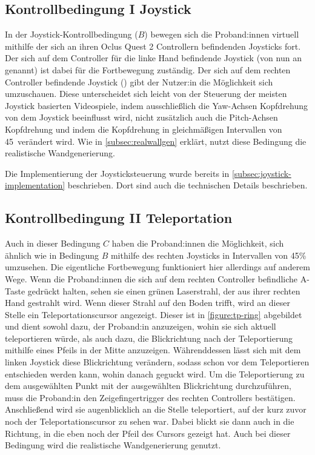         \subsection{Kontrollbedingung I Joystick}\label{subsec:joystick}
            In der Joystick-Kontrollbedingung ($B$) bewegen sich die Proband:innen virtuell mithilfe der sich an ihren Oclus Quest 2 Controllern befindenden Joysticks fort. %
            Der sich auf dem Controller für die linke Hand befindende Joystick (von nun an  genannt) ist dabei für die Fortbewegung zuständig. Der sich auf dem rechten Controller befindende Joystick () gibt der Nutzer:in die Möglichkeit sich umzuschauen. Diese unterscheidet sich leicht von der Steuerung der meisten Joystick basierten Videospiele, indem ausschließlich die Yaw-Achsen Kopfdrehung von dem Joystick beeinflusst wird, nicht zusätzlich auch die Pitch-Achsen Kopfdrehung und indem die Kopfdrehung in gleichmäßigen Intervallen von
            45\textdegree\
            verändert wird. %
            Wie in \autoref{subsec:realwallgen} erklärt, nutzt diese Bedingung die realistische Wandgenerierung.

            Die Implementierung der Joysticksteuerung wurde bereits in \autoref{subsec:joystick-implementation} beschrieben. Dort sind auch die technischen Details beschrieben.

        \subsection{Kontrollbedingung II Teleportation}\label{subsec:teleport}
            Auch in dieser Bedingung $C$ haben die Proband:innen die Möglichkeit, sich ähnlich wie in Bedingung $B$ mithilfe des rechten Joysticks in Intervallen von 45\textdegree\% umzusehen. Die eigentliche Fortbewegung funktioniert hier allerdings auf anderem Wege. Wenn die Proband:innen die sich auf dem rechten Controller befindliche %
            A-Taste gedrückt halten, sehen sie einen grünen Laserstrahl, der aus ihrer rechten Hand gestrahlt wird.
            Wenn dieser Strahl auf den Boden trifft, wird an dieser Stelle ein Teleportationscursor angezeigt. Dieser ist in \autoref{figure:tp-ring}
            abgebildet und dient sowohl dazu, der Proband:in anzuzeigen, wohin sie sich aktuell teleportieren würde, als auch dazu, die Blickrichtung nach der Teleportierung mithilfe eines Pfeils in der Mitte anzuzeigen. Währenddessen lässt sich mit dem linken Joystick diese Blickrichtung verändern, sodass schon vor dem Teleportieren entschieden werden kann, wohin danach geguckt wird. Um die Teleportierung zu dem ausgewählten Punkt mit der ausgewählten Blickrichtung durchzuführen, muss die Proband:in den Zeigefingertrigger des rechten Controllers bestätigen.
            Anschließend wird sie augenblicklich an die Stelle teleportiert, auf der kurz zuvor noch der Teleportationscursor zu sehen war. Dabei blickt sie dann auch in die Richtung, in die eben noch der Pfeil des Cursors gezeigt hat.
            Auch bei dieser Bedingung wird die realistische Wandgenerierung genutzt.

